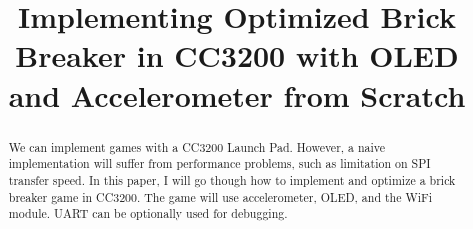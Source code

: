 \documentclass[conference]{IEEEtran}
\begin{document}
\lstset{
	basicstyle=\ttfamily
}

\begin{comment}
Hi Class,

Please use the following format from IEEE for your final project report.
https://www.ieee.org/conferences/publishing/templates.html

The margin, font size are not important: rather your report should:
-have title
-two column
-have abstract, introduction, conclusion and other sections you want to add
-Have references
-Your report should have detailed information explaining the motivation,
 approach, components used and different communications or methodologies they
 have used.

-Demonstration video: 5 minutes is recommended. If you want to go longer you
 can.

-All the source code and detailed implementation details on how the experiment
 could be repeated again. This includes all the schematics and details about
 other services they might have used. For example, if someone has used api,
 where to get the api, what things need to be configured on the hosting side or
 on the user side.

-If using aws lambda, the functions used on lambda services and all the small
 details.

Houman
\end{comment}

\title{
 Implementing Optimized Brick Breaker in CC3200 with OLED and Accelerometer from
 Scratch
}

\author{
}

\maketitle

\begin{abstract}
We can implement games with a CC3200 Launch Pad. However, a naive implementation
 will suffer from performance problems, such as limitation on SPI transfer
 speed. In this paper, I will go though how to implement and optimize a brick
 breaker game in CC3200. The game will use accelerometer, OLED, and the WiFi
 module. UART can be optionally used for debugging. 
\end{abstract}
\end{document}
